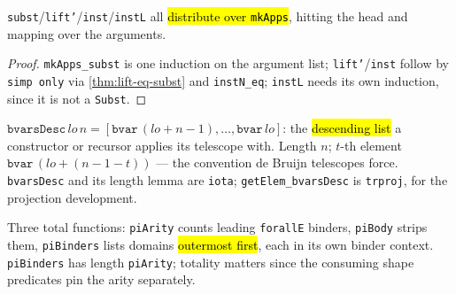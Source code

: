 \begin{lemma}
\label{fam:mkapps-stability}
\leanok
{} 

 \texttt{subst}/\texttt{lift'}/\texttt{inst}/\texttt{instL} all
\hl{distribute over \texttt{mkApps}}, hitting the head and mapping over the arguments.
\end{lemma}
\begin{proof}
\leanok
{} \texttt{mkApps\_subst} is one induction on the argument list;
\texttt{lift'}/\texttt{inst} follow by \texttt{simp only} via \ref{thm:lift-eq-subst} and
\texttt{instN\_eq}; \texttt{instL} needs its own induction, since it is not a
\texttt{Subst}.
\end{proof}

\begin{definition}
\label{def:bvarsdesc}
\leanok
{} 

 $\texttt{bvarsDesc}\,lo\,n = [\texttt{bvar}\,(lo{+}n{-}1),\dots,\texttt{bvar}\,lo]$:
the \hl{descending list} a constructor or recursor applies its telescope with.
Length $n$; $t$-th element $\texttt{bvar}\,(lo+(n{-}1{-}t))$ --- the convention de
Bruijn telescopes force. \texttt{bvarsDesc} and its length lemma are \texttt{iota};
\texttt{getElem\_bvarsDesc} is \texttt{trproj}, for the projection development.
\end{definition}

\begin{definition}
\label{def:pi-telescope}
\leanok
{} 

 Three total functions: \texttt{piArity} counts leading
\texttt{forallE} binders, \texttt{piBody} strips them, \texttt{piBinders} lists domains
\hl{outermost first}, each in its own binder context.
\texttt{piBinders} has length \texttt{piArity}; totality matters since the
consuming shape predicates pin the arity separately.
\end{definition}

